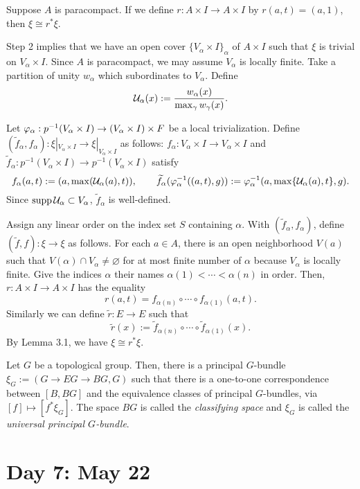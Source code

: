 \documentclass{../../../small}
\begin{document}
\begin{lem*}[Step 3 of 3.2]
Suppose $A$ is paracompact.
If we define $r:A\times I\to A\times I$ by $r(a,t)=(a,1)$, then $\xi\cong r^*\xi$.
\end{lem*}
\begin{pf}
Step 2 implies that we have an open cover $\{V_\alpha\times I\}_\alpha$ of $A\times I$ such that $\xi$ is trivial on $V_\alpha\times I$.
Since $A$ is paracompact, we may assume $V_\alpha$ is locally finite.
Take a partition of unity $w_\alpha$ which subordinates to $V_\alpha$.
Define
\[\mathcal{U}_\alpha(x):=\frac{w_\alpha(x)}{\max_\gamma w_\gamma(x)}.\]

Let $\varphi_\alpha:p^{-1}(V_\alpha\times I)\to(V_\alpha\times I)\times F$ be a local trivialization.
Define $(\tilde f_\alpha,f_\alpha):\xi|_{V_\alpha\times I}\to\xi|_{V_\alpha\times I}$ as follows:
$f_\alpha:V_\alpha\times I\to V_\alpha\times I$ and $\tilde f_\alpha:p^{-1}(V_\alpha\times I)\to p^{-1}(V_\alpha\times I)$ satisfy
\[f_\alpha(a,t):=(a,\max(\mathcal{U}_\alpha(a),t)),\qquad \widetilde f_\alpha(\varphi_\alpha^{-1}((a,t),g)):=\varphi_\alpha^{-1}(a,\max\{\mathcal{U}_\alpha(a),t\},g).\]
Since $\operatorname{supp}\mathcal{U}_\alpha\subset V_\alpha$, $\tilde f_\alpha$ is well-defined.

Assign any linear order on the index set $S$ containing $\alpha$.
With $(\tilde f_\alpha,f_\alpha)$, define $(\tilde f,f):\xi\to\xi$ as follows.
For each $a\in A$, there is an open neighborhood $V(a)$ such that $V(\alpha)\cap V_\alpha\ne\varnothing$ for at most finite number of $\alpha$ because $V_\alpha$ is locally finite.
Give the indices $\alpha$ their names $\alpha(1)<\cdots<\alpha(n)$ in order.
Then, $r:A\times I\to A\times I$ has the equality
\[r(a,t)=f_{\alpha(n)}\circ\cdots\circ f_{\alpha(1)}(a,t).\]
Similarly we can define $\tilde r:E\to E$ such that
\[\tilde r(x):=\tilde f_{\alpha(n)}\circ\cdots\circ\tilde f_{\alpha(1)}(x).\]
By Lemma 3.1, we have $\xi\cong r^*\xi$.
\end{pf}


\begin{thm*}[3.4]
Let $G$ be a topological group.
Then, there is a principal $G$-bundle $\xi_G:=(G\to EG\to BG,G)$ such that there is a one-to-one correspondence between $[B,BG]$ and the equivalence classes of principal $G$-bundles, via $[f]\mapsto[f^*\xi_G]$.
The space $BG$ is called the \emph{classifying space} and $\xi_G$ is called the \emph{universal principal $G$-bundle}.
\end{thm*}


\newpage
\section{Day 7: May 22}
\end{document}
